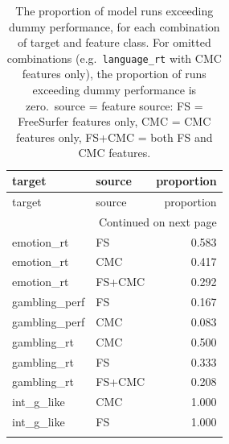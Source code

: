 \documentclass{article}
\begin{document}


\begin{longtable}{llr}
	\caption{The proportion of model runs exceeding dummy performance, for each combination of target and feature class. For omitted combinations (e.g.\ \texttt{language\_rt} with CMC features only), the proportion of runs exceeding dummy performance is zero.\ source = feature source: FS = FreeSurfer features only, CMC = CMC features only, FS+CMC = both FS and CMC features.} \label{tab:cmc-p-target-predictive} \\
	\toprule
	target & source & proportion \\
	\midrule
	\endfirsthead
	\toprule
	target & source & proportion \\
	\midrule
	\endhead
	\midrule
	\multicolumn{3}{r}{Continued on next page} \\
	\midrule
	\endfoot
	\bottomrule
	\endlastfoot
	emotion\_rt & FS & 0.583 \\
	emotion\_rt & CMC & 0.417 \\
	\vspace{0.2cm}
	emotion\_rt & FS+CMC & 0.292 \\
	gambling\_perf & FS & 0.167 \\
	\vspace{0.2cm}
	gambling\_perf & CMC & 0.083 \\
	gambling\_rt & CMC & 0.500 \\
	gambling\_rt & FS & 0.333 \\
	\vspace{0.2cm}
	gambling\_rt & FS+CMC & 0.208 \\
	int\_g\_like & CMC & 1.000 \\
	int\_g\_like & FS & 1.000 \\
	\vspace{0.2cm}

\end{longtable}
\end{document}
